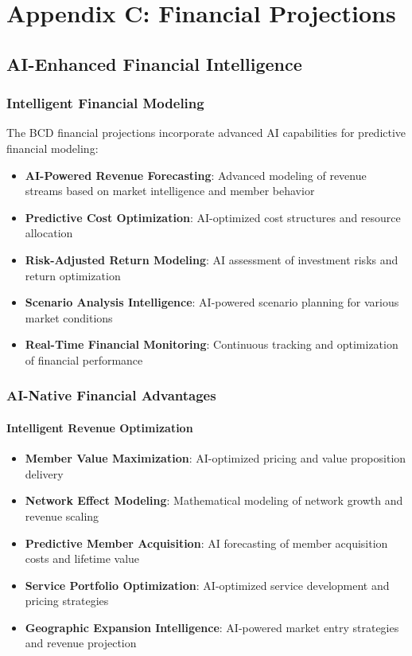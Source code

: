 \documentclass[12pt,a4paper]{book}
\begin{document}
\chapter{Appendix C: Financial Projections}

\section{AI-Enhanced Financial Intelligence}

\subsection{Intelligent Financial Modeling}

The BCD financial projections incorporate advanced AI capabilities for predictive financial modeling:

\begin{itemize}
    \item \textbf{AI-Powered Revenue Forecasting}: Advanced modeling of revenue streams based on market intelligence and member behavior
    \item \textbf{Predictive Cost Optimization}: AI-optimized cost structures and resource allocation
    \item \textbf{Risk-Adjusted Return Modeling}: AI assessment of investment risks and return optimization
    \item \textbf{Scenario Analysis Intelligence}: AI-powered scenario planning for various market conditions
    \item \textbf{Real-Time Financial Monitoring}: Continuous tracking and optimization of financial performance
\end{itemize}

\subsection{AI-Native Financial Advantages}

\subsubsection{Intelligent Revenue Optimization}

\begin{itemize}
    \item \textbf{Member Value Maximization}: AI-optimized pricing and value proposition delivery
    \item \textbf{Network Effect Modeling}: Mathematical modeling of network growth and revenue scaling
    \item \textbf{Predictive Member Acquisition}: AI forecasting of member acquisition costs and lifetime value
    \item \textbf{Service Portfolio Optimization}: AI-optimized service development and pricing strategies
    \item \textbf{Geographic Expansion Intelligence}: AI-powered market entry strategies and revenue projection
\end{itemize}
\end{document}
